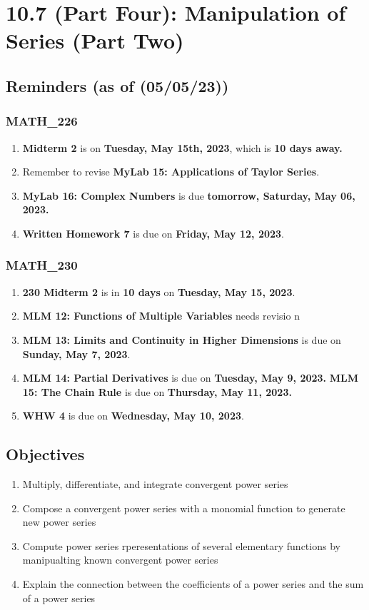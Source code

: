 \chapter{10.7 (Part Four): Manipulation of Series (Part Two)}
\section{Reminders (as of (05/05/23))}
\subsection{MATH\_226}
\begin{enumerate}
  \item  \textbf{Midterm 2} is on \textbf{Tuesday, May 15th, 2023}, which is \textbf{10 days away.}
  \item Remember to revise \textbf{MyLab 15:
        Applications of Taylor Series}.
  \item \textbf{MyLab 16: Complex Numbers} is
        due \textbf{tomorrow, Saturday, May 06, 2023.}
  \item \textbf{Written Homework 7} is due on
        \textbf{Friday, May 12, 2023}.
\end{enumerate}
\subsection{MATH\_230}
\begin{enumerate}
  \item \textbf{230 Midterm 2} is in \textbf{10 days} on
        \textbf{Tuesday, May 15, 2023}.
  \item \textbf{MLM 12: Functions of Multiple Variables} needs revisio n
  \item \textbf{MLM 13: Limits and Continuity in Higher
        Dimensions} is due on \textbf{Sunday, May 7, 2023}.
  \item \textbf{MLM 14: Partial Derivatives} is due on
        \textbf{Tuesday, May 9, 2023.}
        \textbf \textbf{MLM 15: The Chain Rule} is due on
        \textbf{Thursday, May 11, 2023.}
  \item \textbf{WHW 4} is due on \textbf{Wednesday,
        May 10, 2023}.

\end{enumerate}


\section{Objectives}
\begin{enumerate}
  \item Multiply, differentiate, and integrate convergent
        power series
  \item Compose a convergent power series with a
        monomial function to generate new power series
  \item Compute power series rperesentations of several
        elementary functions by manipualting known
        convergent power series
  \item Explain the connection between the coefficients
        of a power series and the sum of a power series
\end{enumerate}

